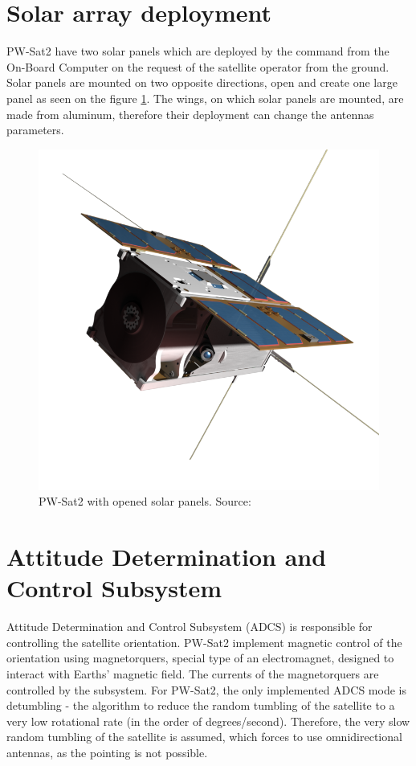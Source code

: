 \section{Solar array deployment}
PW-Sat2 have two solar panels which are deployed by the command from the On-Board Computer on the request of the satellite operator from the ground. Solar panels are mounted on two opposite directions, open and create one large panel as seen on the figure \ref{PW-Sat_solar_panels}. The wings, on which solar panels are mounted, are made from aluminum, therefore their deployment can change the antennas parameters.
\begin{figure}
    \centering
    \includegraphics[width=0.38\paperwidth]{img/3/pwsat_solar_panels.png}
    \caption{PW-Sat2 with opened solar panels. Source: \cite{PW_sat2_photo}}
    \label{PW-Sat_solar_panels}
\end{figure}

\section{Attitude Determination and Control Subsystem}
Attitude Determination and Control Subsystem (ADCS) is responsible for controlling the satellite orientation. PW-Sat2 implement magnetic control of the orientation using magnetorquers, special type of an electromagnet, designed to interact with Earths' magnetic field. The currents of the magnetorquers are controlled by the subsystem. For PW-Sat2, the only implemented ADCS mode is detumbling - the algorithm to reduce the random tumbling of the satellite to a very low rotational rate (in the order of degrees/second). Therefore, the very slow random tumbling of the satellite is assumed, which forces to use omnidirectional antennas, as the pointing is not possible.


